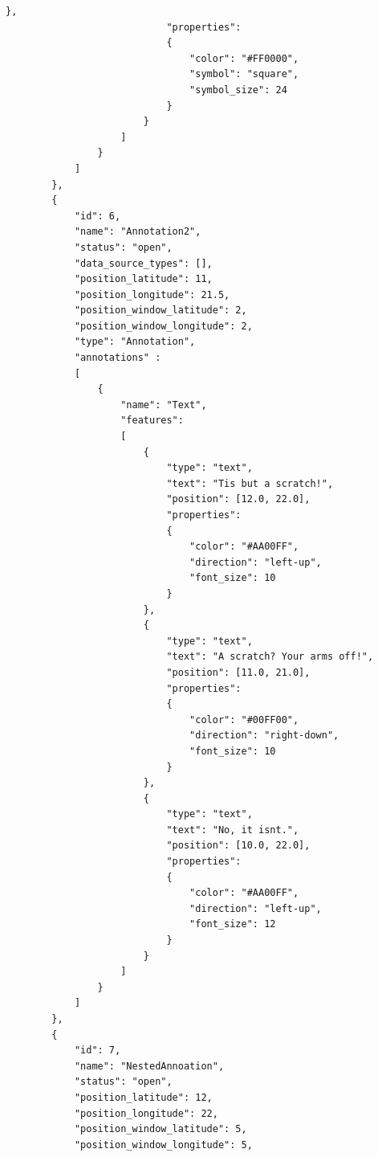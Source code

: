 \begin{lstlisting}[basicstyle=\small\ttfamily]
                            },
                            "properties":
                            {
                                "color": "#FF0000",
                                "symbol": "square",
                                "symbol_size": 24
                            }
                        }
                    ]
                }
            ]
        },
        {
            "id": 6,
            "name": "Annotation2",
            "status": "open",
            "data_source_types": [],
            "position_latitude": 11,
            "position_longitude": 21.5,
            "position_window_latitude": 2,
            "position_window_longitude": 2,
            "type": "Annotation",
            "annotations" :
            [
                {
                    "name": "Text",
                    "features":
                    [
                        {
                            "type": "text",
                            "text": "Tis but a scratch!",
                            "position": [12.0, 22.0],
                            "properties":
                            {
                                "color": "#AA00FF",
                                "direction": "left-up",
                                "font_size": 10
                            }
                        },
                        {
                            "type": "text",
                            "text": "A scratch? Your arms off!",
                            "position": [11.0, 21.0],
                            "properties":
                            {
                                "color": "#00FF00",
                                "direction": "right-down",
                                "font_size": 10
                            }
                        },
                        {
                            "type": "text",
                            "text": "No, it isnt.",
                            "position": [10.0, 22.0],
                            "properties":
                            {
                                "color": "#AA00FF",
                                "direction": "left-up",
                                "font_size": 12
                            }
                        }                        
                    ]
                }
            ]
        },
        {
            "id": 7,
            "name": "NestedAnnoation",
            "status": "open",
            "position_latitude": 12,
            "position_longitude": 22,
            "position_window_latitude": 5,
            "position_window_longitude": 5,

\end{lstlisting}

